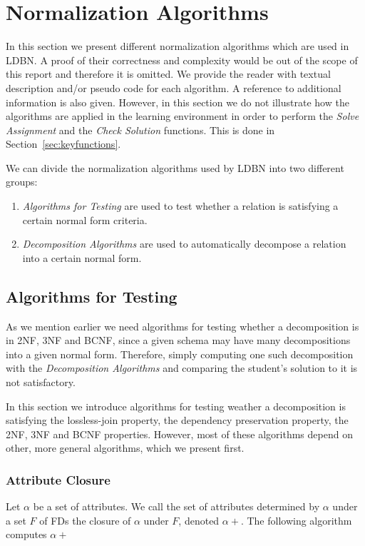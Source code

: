 \section{Normalization Algorithms}
\label{sec:alg}
In this section we present different normalization algorithms which are used
in LDBN. A proof of their correctness and complexity would be out of the 
scope of this report and therefore it is omitted. We provide the
reader with textual description and/or pseudo code for each algorithm. 
A reference to additional information is also given. However, in this section we do not
illustrate how the algorithms are applied in the learning environment in order
to perform the \textit{Solve Assignment} and the \textit{Check Solution} functions.
This is done in Section~\ref{sec:keyfunctions}.

We can divide the normalization algorithms used by LDBN into two different groups:

\begin{enumerate}
  \item \textit{Algorithms for Testing} are used to test whether a relation is satisfying a certain normal form criteria.
  \item \textit{Decomposition Algorithms} are used to automatically decompose a relation into a certain normal form.
\end{enumerate}

\subsection{Algorithms for Testing}
\label{sec:algtest}
As we mention earlier we need algorithms for testing whether a decomposition 
is in 2NF, 3NF and BCNF, since a given schema may have many decompositions into a given normal form. Therefore,
simply computing one such decomposition with the \textit{Decomposition Algorithms} and comparing the student's solution to it is
not satisfactory. 

In this section we introduce algorithms for testing weather a decomposition 
is satisfying the lossless-join property, the
dependency preservation property, the 2NF, 3NF and BCNF properties. 
However, most of these algorithms depend on other, more general
algorithms, which we present first.  

\subsubsection{Attribute Closure}
Let $\alpha$  be a set of attributes. 
We call the set of attributes determined by $\alpha$ under a set $F$ of 
FDs the closure of $\alpha$ under $F$, denoted $\alpha +$. The following algorithm
computes $\alpha+$

